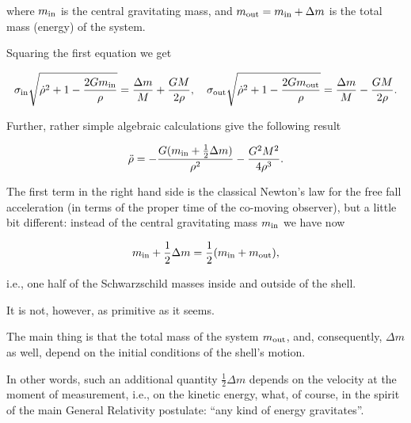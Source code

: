where $m_{\rm in}$ is the central gravitating mass, and $m_{\rm out} = m_{\rm in} + \Delta m$ is the total mass (energy) of the system. 

Squaring the first equation we get

\begin{gather}

\label{dmM}

\sigma_{\rm in} \sqrt{\dot \rho^2 + 1 - \frac{2 G m_{\rm in}}{\rho}} = \frac{\Delta m}{M} + \frac{G M}{2 \rho} ,\quad 

\sigma_{\rm out} \sqrt{\dot \rho^2 + 1 - \frac{2 G m_{\rm out}}{\rho}} = \frac{\Delta m}{M} - \frac{G M}{2 \rho} .

\end{gather}

Further, rather simple algebraic calculations give the following result

\begin{equation}

\label{Nlm}

\ddot \rho = - \frac{G (m_{\rm in} + \frac{1}{2} \Delta m)}{\rho^2} - \frac{G^2 M^2}{4 \rho^3} .

\end{equation}





The first term in the right hand side is the classical Newton's law for the free fall acceleration (in terms of the proper time of the co-moving observer), but a little bit different: instead of the central gravitating mass $m_{\rm in}$ we have now 

$$

m_{\rm in} + \frac{1}{2} \Delta m = \frac{1}{2} (m_{\rm in} + m_{\rm out}),

$$ 

i.e., one half of the Schwarzschild masses inside and outside of the shell. 

It is not, however, as primitive as it seems. 

The main thing is that the total mass of the system  $m_{\rm out}$, and, consequently, $\Delta m$ as well, depend on the initial conditions of the shell's motion. 

In other words, such an additional quantity $\frac{1}{2}\Delta m$ depends on the velocity at the moment of measurement, i.e., on the kinetic energy, what, of course, in the spirit of the main General Relativity postulate: ``any kind of energy gravitates''.



